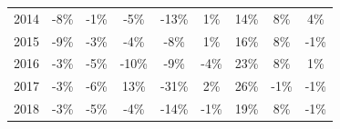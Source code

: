 \begin{table}[H]
{\begin{tabular}{ccccccccc}
2014 & -8\%            & -1\%           & -5\%              & -13\%      & 1\%        & 14\%        & 8\%        & 4\%                \\
2015 & -9\%            & -3\%           & -4\%              & -8\%       & 1\%        & 16\%        & 8\%        & -1\%               \\
2016 & -3\%            & -5\%           & -10\%             & -9\%       & -4\%       & 23\%        & 8\%        & 1\%                \\
2017 & -3\%            & -6\%           & 13\%              & -31\%      & 2\%        & 26\%        & -1\%       & -1\%               \\
2018 & -3\%            & -5\%           & -4\%              & -14\%      & -1\%       & 19\%        & 8\%        & -1\%  \\ 
   \bottomrule
\end{tabular}}
\end{table} 

